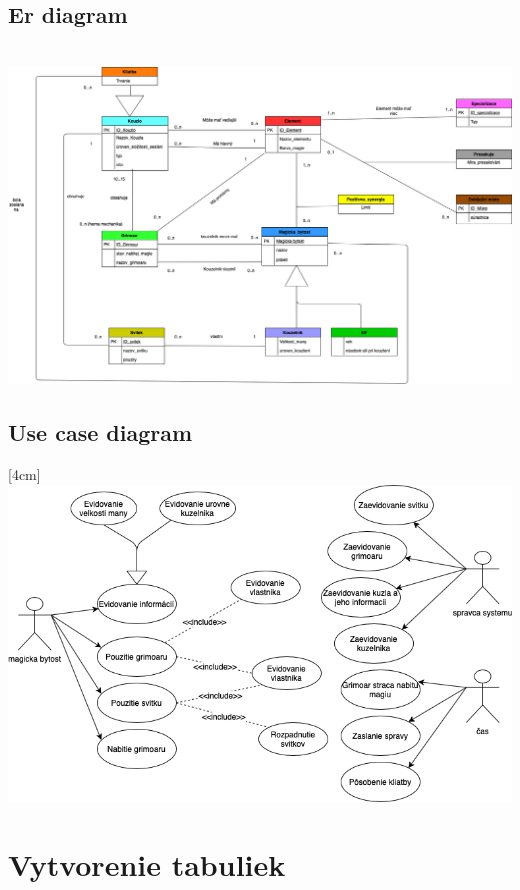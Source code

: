 \documentclass{article}
\begin{document}
    \subsection{Er diagram}
    \begin{center}\\[1cm]
    \hspace*{-2cm} 
    \includegraphics[width=1.25\linewidth]{./erdiagram.png}
    \end{center}
    \newpage
    \subsection{Use case diagram}
    \begin{center}[4cm]
    \hspace*{-2cm} 
    \includegraphics[width=1.25\linewidth]{./usecase.png}
    \end{center}
    
    \newpage
    \section{Vytvorenie tabuliek}
\end{document}
